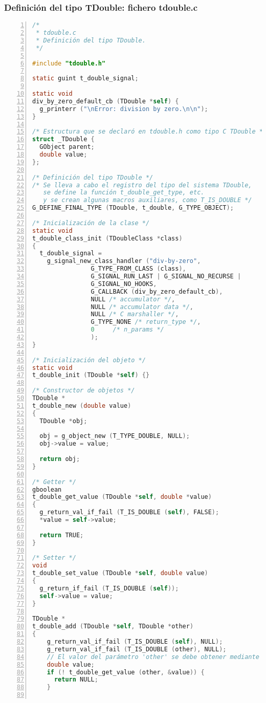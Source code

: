 \subsubsection{Definición del tipo \textsf{TDouble}: fichero \textsf{tdouble.c}}
\begin{lstlisting}[language=C, numbers=left]
/*
 * tdouble.c
 * Definición del tipo TDouble.
 */

#include "tdouble.h"

static guint t_double_signal;

static void
div_by_zero_default_cb (TDouble *self) {
  g_printerr ("\nError: division by zero.\n\n");
}

/* Estructura que se declaró en tdouble.h como tipo C TDouble */
struct _TDouble {
  GObject parent;
  double value;
};

/* Definición del tipo TDouble */
/* Se lleva a cabo el registro del tipo del sistema TDouble,
   se define la función t_double_get_type, etc.
   y se crean algunas macros auxiliares, como T_IS_DOUBLE */
G_DEFINE_FINAL_TYPE (TDouble, t_double, G_TYPE_OBJECT);

/* Inicialización de la clase */
static void
t_double_class_init (TDoubleClass *class)
{
  t_double_signal =
    g_signal_new_class_handler ("div-by-zero",
				G_TYPE_FROM_CLASS (class),
				G_SIGNAL_RUN_LAST | G_SIGNAL_NO_RECURSE |
				G_SIGNAL_NO_HOOKS,
				G_CALLBACK (div_by_zero_default_cb),
				NULL /* accumulator */,
				NULL /* accumulator data */,
				NULL /* C marshaller */,
				G_TYPE_NONE /* return_type */,
				0     /* n_params */
				);
}

/* Inicialización del objeto */
static void
t_double_init (TDouble *self) {}

/* Constructor de objetos */
TDouble *
t_double_new (double value)
{
  TDouble *obj;
  
  obj = g_object_new (T_TYPE_DOUBLE, NULL);
  obj->value = value;
  
  return obj;
}

/* Getter */
gboolean
t_double_get_value (TDouble *self, double *value)
{
  g_return_val_if_fail (T_IS_DOUBLE (self), FALSE);
  *value = self->value;
  
  return TRUE;
}

/* Setter */
void
t_double_set_value (TDouble *self, double value)
{
  g_return_if_fail (T_IS_DOUBLE (self));
  self->value = value;
}

TDouble *
t_double_add (TDouble *self, TDouble *other)
{
    g_return_val_if_fail (T_IS_DOUBLE (self), NULL);
    g_return_val_if_fail (T_IS_DOUBLE (other), NULL);
    // El valor del parámetro 'other' se debe obtener mediante el método 'getter'
    double value;
    if (! t_double_get_value (other, &value)) {
      return NULL;
    }
    

\end{lstlisting}
